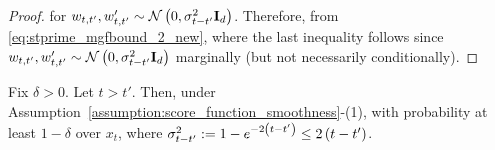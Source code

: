 \begin{proof}
    for $w_{t,t'}, w_{t,t'}' \sim \mathcal{N}\left(0,\sigma_{t-t'}^{2}\mathbf{I}_{d}\right)$. Therefore, from \eqref{eq:stprime_mgfbound_2_new}, 
    where the last inequality follows since $w_{t,t'}, w_{t,t'}' \sim \mathcal{N}\left(0,\sigma_{t-t'}^{2}\mathbf{I}_{d}\right)$ marginally (but not necessarily conditionally). %
\end{proof}
\begin{lemma}\label{eq:time_smoothness_of_score_function} Fix $\delta > 0$. Let $t > t'$.  Then, under Assumption~\ref{assumption:score_function_smoothness}-(1), with probability at least $1-\delta$ over $x_{t}$, 
where $\sigma_{t-t'}^{2} := 1-e^{-2\left(t-t'\right)} \leq 2\left(t-t'\right)$.
\end{lemma}
